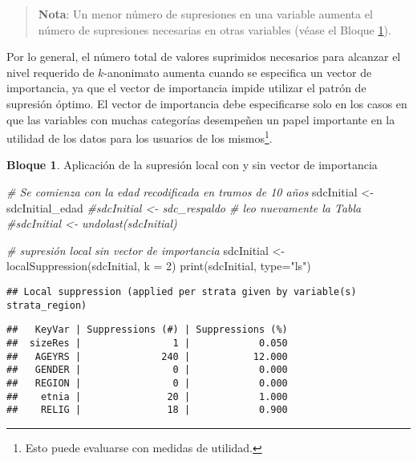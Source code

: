 \documentclass[
]{book}
\newenvironment{Shaded}{\begin{snugshade}}{\end{snugshade}}
\newcommand{\AttributeTok}[1]{\textcolor[rgb]{0.77,0.63,0.00}{#1}}
\newcommand{\CommentTok}[1]{\textcolor[rgb]{0.56,0.35,0.01}{\textit{#1}}}
\newcommand{\DecValTok}[1]{\textcolor[rgb]{0.00,0.00,0.81}{#1}}
\newcommand{\FunctionTok}[1]{\textcolor[rgb]{0.00,0.00,0.00}{#1}}
\newcommand{\NormalTok}[1]{#1}
\newcommand{\OtherTok}[1]{\textcolor[rgb]{0.56,0.35,0.01}{#1}}
\newcommand{\StringTok}[1]{\textcolor[rgb]{0.31,0.60,0.02}{#1}}
\theoremstyle{definition}
\theoremstyle{definition}
\newtheorem{example}{Bloque}[chapter]
\theoremstyle{definition}
\theoremstyle{definition}
\theoremstyle{remark}
\begin{document}
\begin{quote}
\textbf{Nota}: Un menor número de supresiones en una variable aumenta el número de supresiones necesarias en otras variables (véase el Bloque \ref{exm:bloque21jgm}).
\end{quote}

Por lo general, el número total de valores suprimidos necesarios para alcanzar el nivel requerido de \(k\)-anonimato aumenta cuando se especifica un vector de importancia, ya que el vector de importancia impide utilizar el patrón de supresión óptimo. El vector de importancia debe especificarse solo en los casos en que las variables con muchas categorías desempeñen un papel importante en la utilidad de los datos para los usuarios de los mismos\footnote{Esto puede evaluarse con medidas de utilidad.}.

\begin{example}
\protect\hypertarget{exm:bloque21jgm}{}\label{exm:bloque21jgm}Aplicación de la supresión local con y sin vector de importancia
\end{example}

\begin{Shaded}
\begin{Highlighting}[]
\CommentTok{\# Se comienza con la edad recodificada en tramos de 10 años}
\NormalTok{sdcInitial }\OtherTok{\textless{}{-}}\NormalTok{ sdcInitial\_edad}
\CommentTok{\#sdcInitial \textless{}{-} sdc\_respaldo \# leo nuevamente la Tabla}
\CommentTok{\#sdcInitial \textless{}{-} undolast(sdcInitial)}

\CommentTok{\# supresión local sin vector de importancia}
\NormalTok{sdcInitial }\OtherTok{\textless{}{-}} \FunctionTok{localSuppression}\NormalTok{(sdcInitial, }\AttributeTok{k =} \DecValTok{2}\NormalTok{)}
\FunctionTok{print}\NormalTok{(sdcInitial, }\AttributeTok{type=}\StringTok{"ls"}\NormalTok{)}
\end{Highlighting}
\end{Shaded}

\begin{verbatim}
## Local suppression (applied per strata given by variable(s) strata_region)
\end{verbatim}

\begin{verbatim}
##   KeyVar | Suppressions (#) | Suppressions (%)
##  sizeRes |                1 |            0.050
##   AGEYRS |              240 |           12.000
##   GENDER |                0 |            0.000
##   REGION |                0 |            0.000
##    etnia |               20 |            1.000
##    RELIG |               18 |            0.900
\end{verbatim}
\end{document}
